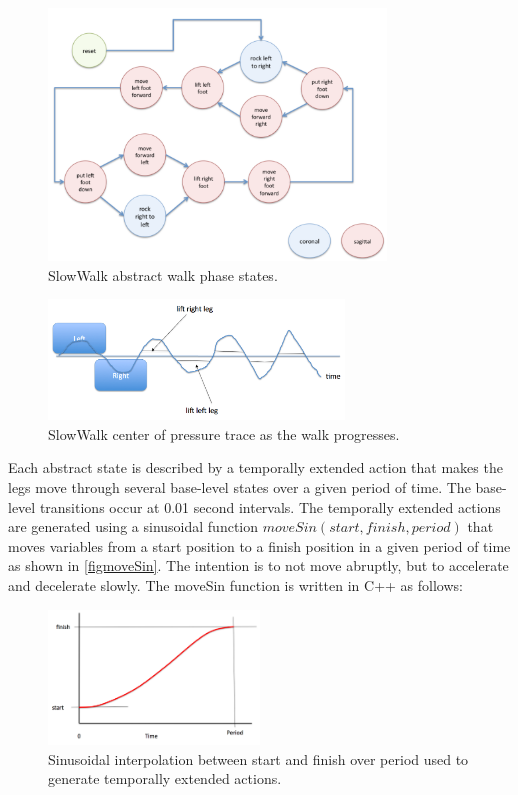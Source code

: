 \documentclass[pdftex,11pt,a4paper]{report}
\begin{document}
\begin{figure}[ht]
\centering
\includegraphics[width=0.8\textwidth]{figures/SlowwalkStates}
\caption{SlowWalk abstract walk phase states.} \label{figSlowwalkStates}
\end{figure}

\begin{figure}[ht]
\centering
\includegraphics[width=0.7\textwidth]{figures/SlowwalkCoP}
\caption{SlowWalk center of pressure trace as the walk progresses.} \label{figSlowwalkCoP}
\end{figure}

Each abstract state is described by a temporally extended action that makes the legs move through several base-level states over a given period of time. The base-level transitions occur at 0.01 second intervals. The temporally extended actions are generated using a sinusoidal function $moveSin(start, finish, period)$ that moves variables from a start position to a finish position in a given period of time as shown in \autoref{figmoveSin}. The intention is to not move abruptly, but to accelerate and decelerate slowly. The moveSin function is written in C++ as follows:

\begin{figure}
\centering
\includegraphics[width=0.5\textwidth]{figures/moveSin}
\caption{Sinusoidal interpolation between start and finish over period used to generate temporally extended actions.} \label{figmoveSin}
\end{figure}
\end{document}
